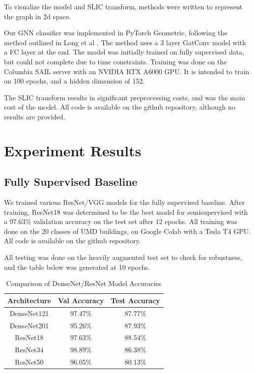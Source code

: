 \documentclass{article}
\begin{document}
To visualize the model and SLIC transform, methods were written to represent the graph in 2d space.

Our GNN classifier was implemented in PyTorch Geometric, following the method outlined in Long et al \cite{long}. The method uses a 3 layer GatConv model with a FC layer at the end. The model was initially trained on fully supervised data, but could not complete due to time constraints. Training was done on the Columbia \@ SAIL server with an NVIDIA RTX A6000 GPU. It is intended to train on 100 epochs, and a hidden dimension of 152. 

The SLIC transform results in significant preprocessing costs, and was the main cost of the model. All code is available on the github repository, although no results are provided.

\section{Experiment Results}
\label{result}

\subsection{Fully Supervised Baseline}

We trained various ResNet/VGG models for the fully supervised baseline. After training, ResNet18 was determined to be the best model for semisupervised with a 97.63\% validation accuracy on the test set after 12 epochs. All training was done on the 20 classes of UMD buildings, on Google Colab with a Tesla T4 GPU. All code is available on the github repository.

All testing was done on the heavily augmented test set to check for robustness, and the table below was generated at 10 epochs.

\begin{table}[H]
    \centering
    \begin{tabular}{|c|c|c|}
        \hline
        Architecture & Val Accuracy & Test Accuracy \\
        \hline
        DenseNet121 & 97.47\% & 87.77\% \\
        \hline
        DenseNet201 & 95.26\% & 87.93\% \\
        \hline
        ResNet18 & 97.63\% & 88.54\% \\
        \hline
        ResNet34 & 98.89\% & 86.38\% \\
        \hline
        ResNet50 & 96.05\% & 80.13\% \\
        \hline
    \end{tabular}
    \caption{Comparison of DenseNet/ResNet Model Accuracies}
    \label{tab:dnrn_model_accuracies}
\end{table}
\end{document}
